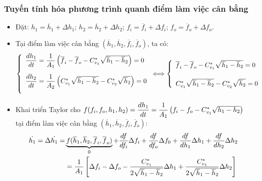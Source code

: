 \subsubsection{Tuyến tính hóa phương trình quanh điểm làm việc cân bằng}
    \begin{itemize}
        \item Đặt: $h_1 = \overline{h}_1 + \Delta h_1$; $h_2 = \overline{h}_2 + \Delta h_2$; $f_i = \overline{f}_i + \Delta f_i$; $f_o = \overline{f}_o + \Delta f_o$.
        \item Tại điểm làm việc cân bằng $(\overline{h}_1, \overline{h}_2, \overline{f}_i, \overline{f}_o)$, ta có:
            \begin{align*}
                \left\{\begin{array}{l}
                    \dfrac{dh_1}{dt} = \dfrac{1}{A_1} \left({\overline{f}_i - \overline{f}_o - C_{v_1}^{*}\sqrt{\overline{h}_1 - \overline{h}_2}}\right) = 0\\[.5cm]
                    \dfrac{dh_2}{dt} = \dfrac{1}{A_2} \left({C_{v_1}^{*}\sqrt{\overline{h}_1 - \overline{h}_2} - C_{v_2}^{*}\sqrt{\overline{h}_2}}\right) = 0\\ [.5cm]
                \end{array}\right.
                \Longleftrightarrow
                \left\{\begin{array}{l}
                     \overline{f}_i - \overline{f}_o - C_{v_1}^{*}\sqrt{\overline{h}_1 - \overline{h}_2} = 0 \\ [.5cm]
                    C_{v_1}^{*}\sqrt{\overline{h}_1 - \overline{h}_2} - C_{v_2}^{*}\sqrt{\overline{h}_2} = 0
                \end{array}\right.
            \end{align*}
        \item Khai triển Taylor cho $f(f_i, f_o, h_1, h_2) = \dfrac{dh_1}{dt} = \dfrac{1}{A_1} \left({f_i - f_o - C_{v_1}^{*}\sqrt{h_1 - h_2}}\right)$ tại điểm làm việc cân bằng $(\overline{h}_1, \overline{h}_2, \overline{f}_i, \overline{f}_o)$:
            \begin{align*}
                \dot{h_1} = \Delta \dot{h_1} = & \underbrace{f(\overline{h}_1, \overline{h}_2, \overline{f}_i, \overline{f}_o)}_{0} + \dfrac{df}{df_i}\Delta f_i + \dfrac{df}{df_o}\Delta f_0 + \dfrac{df}{dh_1}\Delta h_1 + \dfrac{df}{dh_2}\Delta h_2 \\
                & = \dfrac{1}{A_1} \pfs{\Delta f_i - \Delta f_o - \dfrac{C_{v_1}^{*}}{2\sqrt{\overline{h}_1 - \overline{h}_2}} \Delta h_1 + \dfrac{C_{v_1}^{*}}{2\sqrt{\overline{h}_1 - \overline{h}_2}} \Delta h_2}

\end{align*}
\end{itemize}

